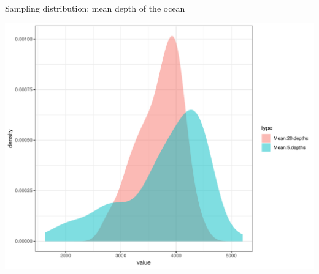\documentclass{beamer}\usepackage[]{graphicx}\usepackage[]{color}
\newenvironment{knitrout}{}{} %
\begin{document}
\begin{frame}[fragile]{Sampling distribution: mean depth of the ocean}


\begin{knitrout}\scriptsize
{}\color{fgcolor}

{\centering \includegraphics[width=1\linewidth]{figure/unnamed-chunk-6-1} 

}



\end{knitrout}

\end{frame}















\end{document}
